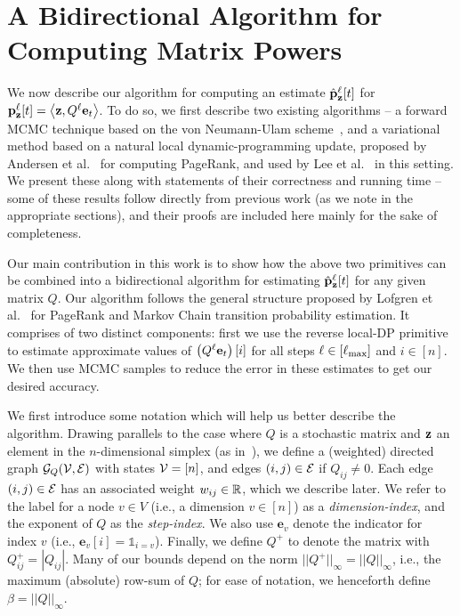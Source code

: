 \section{A Bidirectional Algorithm for Computing Matrix Powers}

We now describe our algorithm for computing an estimate $\hat{\mathbf{p}}_\mathbf{z}^{\ell}[t]$ for ${\mathbf{p}}_\mathbf{z}^{\ell}[t] =\left< \mathbf{z}, Q^{\ell}\mathbf{e}_t \right>$.
To do so, we first describe two existing algorithms -- a forward MCMC technique based on the von Neumann-Ulam scheme~\cite{Wasow1952,ji2013convergence}, and a variational method based on a natural local dynamic-programming update, proposed by Andersen et al.~\cite{andersen2007local} for computing PageRank, and used by Lee et al.~\cite{lee2014asynchronous} in this setting. 
We present these along with statements of their correctness and running time -- some of these results follow directly from previous work (as we note in the appropriate sections), and their proofs are included here mainly for the sake of completeness.


Our main contribution in this work is to show how the above two primitives can be combined into a bidirectional algorithm for estimating $\hat{\mathbf{p}}_\mathbf{z}^{\ell}[t]$ for any given matrix $Q$. 
Our algorithm follows the general structure proposed by Lofgren et al.~\cite{Lofgren2014,banerjee2015fast} for PageRank and Markov Chain transition probability estimation.
It comprises of two distinct components: first we use the reverse local-DP primitive to estimate approximate values of $\left(Q^{\ell}\mathbf{e}_t\right)[i]$ for all steps $\ell \in[\ell_{\max}]$ and $i\in[n]$. 
We then use MCMC samples to reduce the error in these estimates to get our desired accuracy.


We first introduce some notation which will help us better describe the algorithm.
Drawing parallels to the case where $Q$ is a stochastic matrix and $\mathbf{z}$ an element in the $n$-dimensional simplex (as in~\cite{banerjee2015fast}), we define a (weighted) directed graph ${\mathcal{G}}_Q({\mathcal{V}},{\mathcal{E}})$ with states ${\mathcal{V}} = [n]$, and edges $(i,j)\in {\mathcal{E}}$ if $Q_{ij}\neq 0$. 
Each edge $(i,j)\in{\mathcal{E}}$ has an associated weight $w_{ij}\in\mathbb{R}$, which we describe later.
We refer to the label for a node $v\in V$ (i.e., a dimension $v\in[n]$) as a \emph{dimension-index}, and the exponent of $Q$ as the \emph{step-index}.
We also use $\mathbf{e}_v$ denote the indicator for index $v$ (i.e., $\mathbf{e}_v[i] = \mathds{1}_{i=v}$). 
Finally, we define $Q^+$ to denote the matrix with $Q^+_{ij} = |Q_{ij}|$. 
Many of our bounds depend on the norm $||Q^+||_{\infty} = ||Q||_{\infty}$, i.e., the maximum (absolute) row-sum of $Q$; for ease of notation, we henceforth define $\beta = ||Q||_{\infty}$. 

